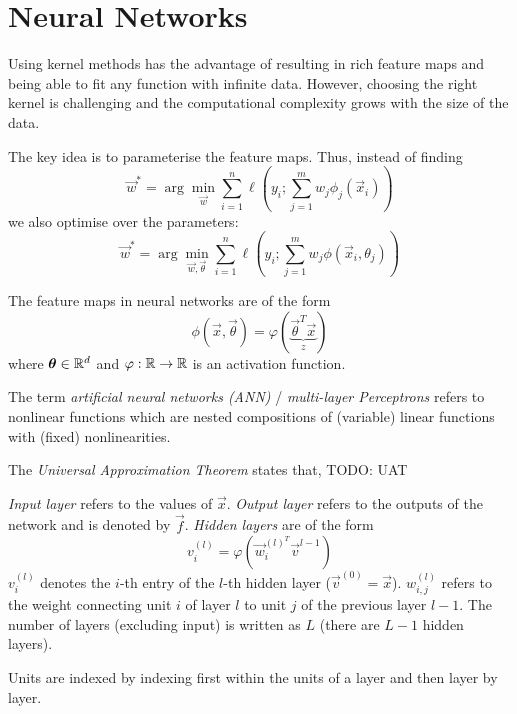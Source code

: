 \section{Neural Networks}
Using kernel methods has the advantage of resulting in rich
feature maps and being able to fit any function with infinite data.
However, choosing the right kernel is challenging and the
computational complexity grows with the size of the data.

The key idea is to parameterise the feature maps.
Thus, instead of finding
\begin{equation*}
    \vec{w}^* = \arg\min_{\vec{w}}{
        \sum_{i=1}^n{\ell\left(y_i; \sum_{j=1}^m{w_j \phi_j(\vec{x}_i)} \right)}
    }
\end{equation*}
we also optimise over the parameters:
\begin{equation*}
    \vec{w}^* = \arg\min_{\vec{w}, \vec{\theta}}{
        \sum_{i=1}^n{\ell\left(y_i; \sum_{j=1}^m{w_j \phi(\vec{x}_i, \theta_j)} \right)}
    }
\end{equation*}

The feature maps in neural networks are of the form
\begin{equation*}
    \phi(\vec{x}, \vec{\theta})
    = \varphi(\underbrace{\vec{\theta}^T \vec{x}}_{z})
\end{equation*}
where $\boldsymbol{\theta} \in \mathbb{R}^d$ and
$\varphi : \mathbb{R} \to \mathbb{R}$ is an activation function.

The term \emph{artificial neural networks (ANN)} /
\emph{multi-layer Perceptrons} refers to nonlinear functions
which are nested compositions of (variable) linear functions
with (fixed) nonlinearities.

The \emph{Universal Approximation Theorem} states that,
TODO: UAT

\emph{Input layer} refers to the values of $\vec{x}$.
\emph{Output layer} refers to the outputs of the network
and is denoted by $\vec{f}$.
\emph{Hidden layers} are of the form
\begin{equation*}
    v_i^{(l)} = \varphi(\vec{w}_i^{(l)^T} \vec{v}^{l-1})
\end{equation*}
$v_i^{(l)}$ denotes the $i$-th entry of the $l$-th hidden layer
($\vec{v}^{(0)} = \vec{x}$).
$w_{i,j}^{(l)}$ refers to the weight connecting unit
$i$ of layer $l$ to unit $j$ of the previous layer $l-1$.
The number of layers (excluding input) is written as
$L$ (there are $L - 1$ hidden layers).

Units are indexed by indexing first within the units of a layer
and then layer by layer.


